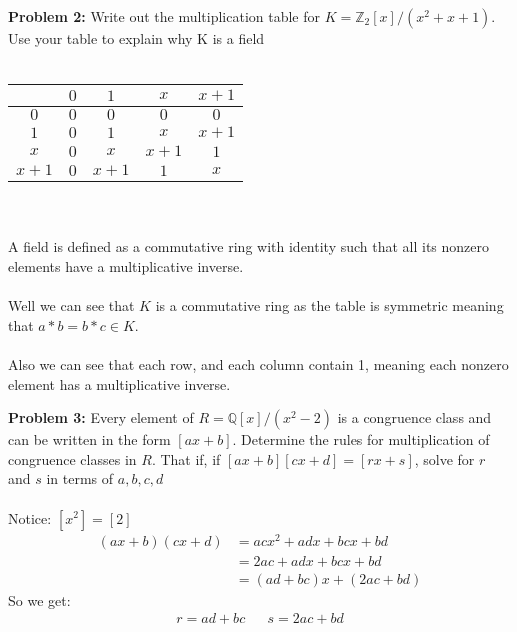 \documentclass[12pt]{article}
\begin{document}
\newpage 

\noindent \textbf{Problem 2: }Write out the multiplication table for $K = \mathbb{Z}_2[x]/(x^2 + x+ 1)$. Use your table to explain why K is a field 
\\ \\
	\begin{table}[h]
		\centering
		\begin{tabular}{|c|c|c|c|c|}
			\hline
			 & $0$ & $1$ & $x$ & $x+1$ \\
			 \hline
			 $0$ & $0$ & $0$ & $0$ & $0$ \\ 
			 \hline
			 $1$ & $0$ & $1$ & $x$ & $x+1$\\
			 \hline
			 $x$ & $0$ & $x$ & $x+1$ & $1$ \\
			 \hline
			 $x+1$ & $0$ & $x+1$ & $1$ & $x$ \\
			 \hline
		\end{tabular}
	\end{table}
\\ \\
A field is defined as a commutative ring with identity such that all its nonzero elements have a multiplicative inverse.
\\ \\
Well we can see that $K$ is a commutative ring as the table is symmetric meaning that $a*b = b*c \in K$.
\\ \\
Also we can see that each row, and each column contain 1, meaning each nonzero element has a multiplicative inverse.

\newpage 

\noindent \textbf{Problem 3: }Every element of $R = \mathbb{Q}[x]/(x^2 - 2)$ is a congruence class and can be written in the form $[ax + b]$. Determine the rules for multiplication of congruence classes in $R$. That if, if $[ax+b][cx+d] = [rx+s]$, solve for $r$ and $s$ in terms of $a,b,c,d$
\\ \\
Notice: $[x^2]=[2]$
	\begin{align*}
		(ax+b)(cx+d) &= acx^2 + adx + bcx + bd \\
		&= 2ac + adx + bcx + bd \\
		&= (ad + bc)x + (2ac + bd)
	\end{align*}
So we get:
	\begin{align*}
		r = ad + bc && s = 2ac + bd
	\end{align*}

\newpage 
\end{document}

